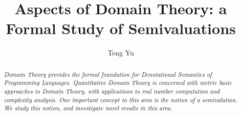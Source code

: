 \documentclass{article}
\begin{document}
\title{Aspects of Domain Theory: a Formal Study of Semivaluations}

\author{Teng Yu}


\maketitle



\begin{abstract}
{\it Domain Theory provides the formal foundation for Denotational Semantics of Programming Languages. Quantitative Domain Theory is concerned with metric basic approaches to Domain Theory, with applications to real number computation and complexity analysis. One important concept in this area is the notion of a semivalution. We study this notion, and investigate novel results in this area. 
}
\end{abstract}

\newpage

\tableofcontents

\newpage
\end{document}
